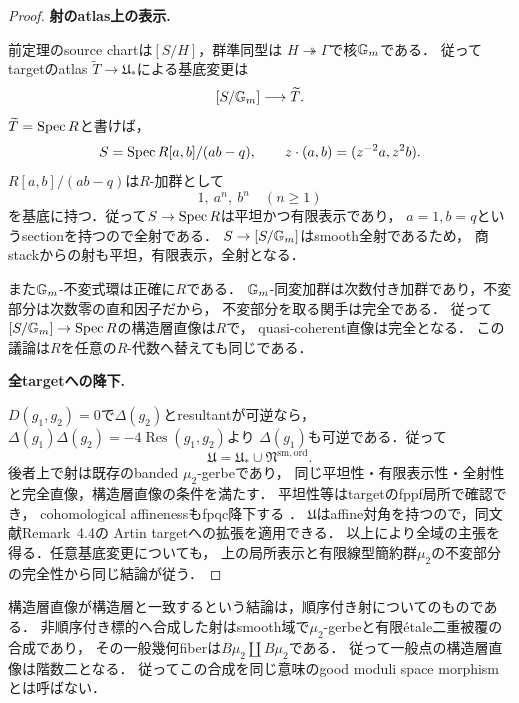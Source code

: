 \begin{proof}
\par\medskip\noindent\textbf{射のatlas上の表示.}\par\nobreak\smallskip
前定理のsource chartは$[S/H]$，群準同型は
$H\twoheadrightarrow\Gamma$で核$\mathbb G_m$である．
従ってtargetのatlas $\widetilde T\to\mathfrak U_*$による基底変更は
\[
 [S/\mathbb G_m]\longrightarrow\widetilde T.
\]
$\widetilde T=\operatorname{Spec} R$と書けば，
\[
 S=\operatorname{Spec} R[a,b]/(ab-q),\qquad
 z\cdot(a,b)=(z^{-2}a,z^2b).
\]
$R[a,b]/(ab-q)$は$R$-加群として
\[
                  1,\ a^n,\ b^n\quad(n\ge1)
\]
を基底に持つ．従って$S\to\operatorname{Spec} R$は平坦かつ有限表示であり，
$a=1,b=q$というsectionを持つので全射である．
$S\to[S/\mathbb G_m]$はsmooth全射であるため，
商stackからの射も平坦，有限表示，全射となる．

また$\mathbb G_m$-不変式環は正確に$R$である．
$\mathbb G_m$-同変加群は次数付き加群であり，不変部分は次数零の直和因子だから，
不変部分を取る関手は完全である．
従って$[S/\mathbb G_m]\to\operatorname{Spec} R$の構造層直像は$R$で，
quasi-coherent直像は完全となる．
この議論は$R$を任意の$R$-代数へ替えても同じである．

\par\medskip\noindent\textbf{全targetへの降下.}\par\nobreak\smallskip
$D(g_1,g_2)=0$で$\Delta(g_2)$とresultantが可逆なら，
$\Delta(g_1)\Delta(g_2)=-4\operatorname{Res}(g_1,g_2)$より
$\Delta(g_1)$も可逆である．従って
\[
 \mathfrak U=\mathfrak U_*\cup\mathfrak N^{\mathrm{sm,ord}}.
\]
後者上で射は既存のbanded $\mu_2$-gerbeであり，
同じ平坦性・有限表示性・全射性と完全直像，構造層直像の条件を満たす．
平坦性等はtargetのfppf局所で確認でき，
cohomological affinenessもfpqc降下する
\cite[Proposition~3.10(v)]{AlperGoodModuli2013}．
$\mathfrak U$はaffine対角を持つので，同文献Remark~4.4の
Artin targetへの拡張を適用できる．
以上により全域の主張を得る．任意基底変更についても，
上の局所表示と有限線型簡約群$\mu_2$の不変部分の完全性から同じ結論が従う．
\end{proof}

\begin{remark}[順序忘却後の射との区別]
構造層直像が構造層と一致するという結論は，順序付き射についてのものである．
非順序付き標的へ合成した射はsmooth域で$\mu_2$-gerbeと有限\'etale二重被覆の合成であり，
その一般幾何fiberは$B\mu_2\amalg B\mu_2$である．
従って一般点の構造層直像は階数二となる．
従ってこの合成を同じ意味のgood moduli space morphismとは呼ばない．
\end{remark}

